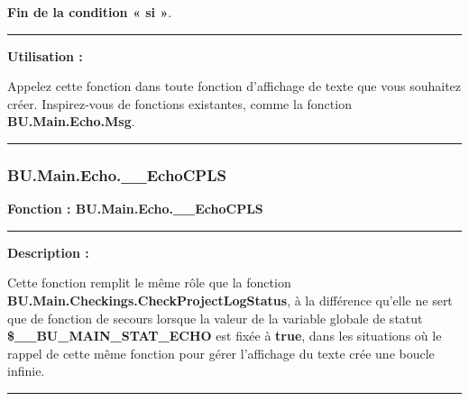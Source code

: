 \documentclass[a4paper,10pt]{article}
\begin{document}
    \begin{justify}
        \textbf{\color{cond}Fin de la condition « si »}.
    \end{justify}


    \par\noindent\rule{\textwidth}{0.4pt}

    \begin{justify}
        \textbf{Utilisation :}

        Appelez cette fonction dans toute fonction d'affichage de texte que vous souhaitez créer. Inspirez-vous de fonctions existantes, comme la fonction \textbf{\color{func}BU.Main.Echo.Msg}.
    \end{justify}



    \color{sec3}\par\noindent\rule{\textwidth}{0.4pt}\color{text}

    \color{sec3}
    \subsubsection{BU.Main.Echo.\_\_EchoCPLS}\color{text}

    \begin{justify}
        \textbf{Fonction : \color{func}BU.Main.Echo.\_\_EchoCPLS}
    \end{justify}


    \par\noindent\rule{\textwidth}{0.4pt}

    \begin{justify}
        \textbf{Description :}

        Cette fonction remplit le même rôle que la fonction \textbf{\color{func}BU.Main.Checkings.CheckProjectLogStatus}, à la différence qu'elle ne sert que de fonction de secours lorsque la valeur de la variable globale de statut \textbf{\color{vars}\$\_\_BU\_MAIN\_STAT\_ECHO} est fixée à \textbf{true}, dans les situations où le rappel de cette même fonction pour gérer l'affichage du texte crée une boucle infinie.
    \end{justify}


    \par\noindent\rule{\textwidth}{0.4pt}
\end{document}
